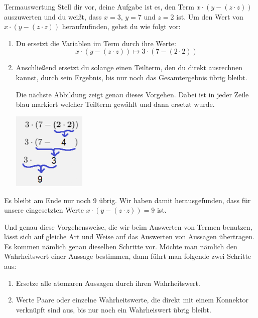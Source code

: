\documentclass[../../main.tex]{subfiles}
\begin{document}
\begin{example}{Termauswertung}
Stell dir vor, deine Aufgabe ist es, den Term $x \cdot (y - (z \cdot z))$ auszuwerten
 und du weißt, dass $x = 3$, $y = 7$ und  $z = 2$ ist.
Um den Wert von $x \cdot (y - (z \cdot z))$ heraufzufinden, gehst
du wie folgt vor:
\begin{enumerate}
    \item Du ersetzt die Variablen im Term durch ihre Werte:
    \[x \cdot (y - (z \cdot z)) \longmapsto 3 \cdot (7 - (2 \cdot 2)) \]
    \item Anschließend ersetzt du solange einen Teilterm, den du direkt ausrechnen 
    kannst, durch sein Ergebnis, bis nur noch das Gesamtergebnis übrig bleibt.
    
    
    Die nächste Abbildung zeigt genau dieses Vorgehen. Dabei ist in jeder Zeile blau markiert welcher Teilterm gewählt und dann ersetzt wurde.
    \begin{center}
        \includegraphics[width=0.275\textwidth]{images/TEMP_termalg.png}
    \end{center}
\end{enumerate}
    Es bleibt am Ende nur noch 9 übrig. Wir haben damit herausgefunden, 
    dass für unsere eingesetzten Werte $x \cdot (y - (z \cdot z)) = 9$ ist.

\end{example}

Und genau diese Vorgehensweise, die wir beim Auswerten von Termen benutzen, 
lässt sich auf gleiche Art und Weise auf das Auswerten von Aussagen übertragen. 
Es kommen nämlich genau dieselben Schritte vor. Möchte man nämlich den Wahrheitswert einer Aussage bestimmen, dann führt man folgende zwei Schritte aus:
    \begin{enumerate}
    \item Ersetze alle atomaren Aussagen durch ihren Wahrheitswert.
    \item Werte Paare oder einzelne Wahrheitswerte, die direkt mit einem Konnektor
        verknüpft sind aus, bis nur noch ein Wahrheiswert übrig bleibt.
    \end{enumerate}
    
\end{document}
